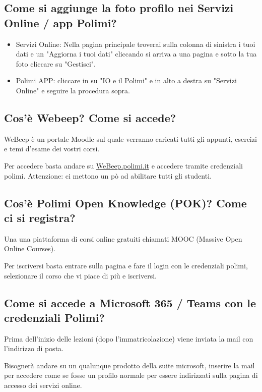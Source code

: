 \documentclass[legal]{polinetwork}
\begin{document}
\subsection{Come si aggiunge la foto profilo nei Servizi Online / app Polimi?}


\begin{itemize}
  \item Servizi Online: Nella pagina principale troverai sulla colonna di sinistra i tuoi dati e un "Aggiorna i tuoi dati" cliccando si arriva a una pagina e sotto la tua foto cliccare su "Gestisci".
  \item Polimi APP: cliccare in su "IO e il Polimi" e in alto a destra su "Servizi Online" e seguire la procedura sopra.
\end{itemize}


\subsection{Cos'è Webeep? Come si accede?}


WeBeep è un portale Moodle sul quale verranno caricati tutti gli appunti, esercizi e temi d'esame dei vostri corsi.

Per accedere basta andare su \href{https://webeep.polimi.it/login/index.php}{WeBeep.polimi.it} e accedere tramite credenziali polimi. Attenzione: ci mettono un pò ad abilitare tutti gli studenti.

\subsection{Cos'è Polimi Open Knowledge (POK)? Come ci si registra?}


Una una piattaforma di corsi online gratuiti chiamati MOOC (Massive Open Online Courses).

Per iscriversi basta entrare sulla pagina e fare il login con le credenziali polimi, selezionare il corso che vi piace di più e iscriversi.

\subsection{Come si accede a Microsoft 365 / Teams con le credenziali Polimi?}


Prima dell'inizio delle lezioni (dopo l'immatricolazione) viene inviata la mail con l'indirizzo di posta.

Bisognerà andare su un qualunque prodotto della suite microsoft, inserire la mail per accedere come se fosse un profilo normale per essere indirizzati sulla pagina di accesso dei servizi online.
\end{document}
